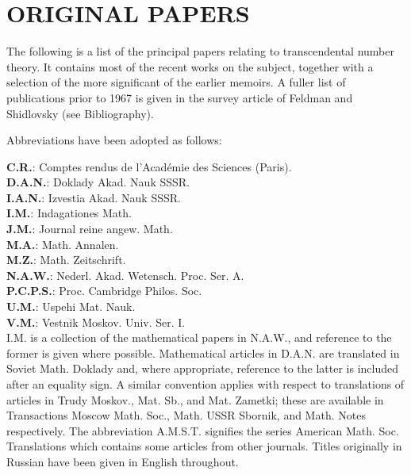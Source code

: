 \chapter*{ORIGINAL PAPERS}


The following is a list of the principal papers relating to transcendental number theory. It contains most of the recent works on the subject, together with a selection of the more significant of the earlier memoirs. A fuller list of publications prior to 1967 is given in the survey article of Feldman and Shidlovsky (see Bibliography).

Abbreviations have been adopted as follows:

\noindent \textbf{C.R.}: Comptes rendus de l'Académie des Sciences (Paris).\\
\noindent \textbf{D.A.N.}: Doklady Akad. Nauk SSSR.\\
\noindent \textbf{I.A.N.}: Izvestia Akad. Nauk SSSR.\\
\noindent \textbf{I.M.}: Indagationes Math.\\
\noindent \textbf{J.M.}: Journal reine angew. Math.\\
\noindent \textbf{M.A.}: Math. Annalen.\\
\noindent \textbf{M.Z.}: Math. Zeitschrift.\\
\noindent \textbf{N.A.W.}: Nederl. Akad. Wetensch. Proc. Ser. A.\\
\noindent \textbf{P.C.P.S.}: Proc. Cambridge Philos. Soc.\\
\noindent \textbf{U.M.}: Uspehi Mat. Nauk.\\
\noindent \textbf{V.M.}: Vestnik Moskov. Univ. Ser. I.\\
I.M. is a collection of the mathematical papers in N.A.W., and reference to the former is given where possible. Mathematical articles in D.A.N. are translated in Soviet Math. Doklady and, where appropriate, reference to the latter is included after an equality sign. A similar convention applies with respect to translations of articles in Trudy Moskov., Mat. Sb., and Mat. Zametki; these are available in Transactions Moscow Math. Soc., Math. USSR Sbornik, and Math. Notes respectively. The abbreviation A.M.S.T. signifies the series American Math. Soc. Translations which contains some articles from other journals. Titles originally in Russian have been given in English throughout.


